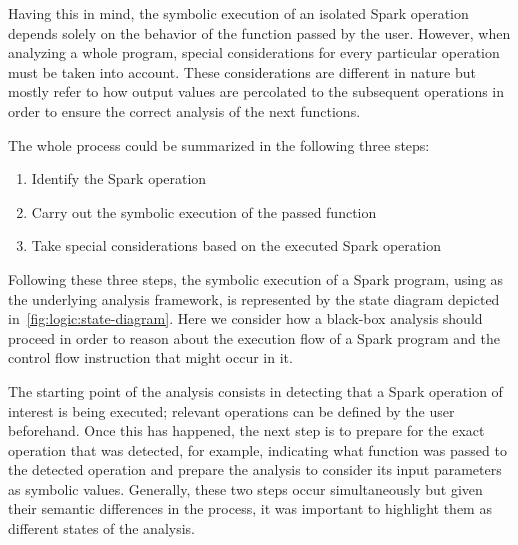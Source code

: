 %	
%	
%	
%	

Having this in mind, the symbolic execution of an isolated Spark operation depends solely on the behavior of the function passed by the user. However, when analyzing a whole program, special considerations for every particular operation must be taken into account. These considerations are different in nature but mostly refer to how output values are percolated to the subsequent operations in order to ensure the correct analysis of the next functions.

The whole process could be summarized in the following three steps:
\begin{enumerate}
	\item Identify the Spark operation
	\item Carry out the symbolic execution of the passed function
	\item Take special considerations based on the executed Spark operation
\end{enumerate}

Following these three steps, the symbolic execution of a Spark program, using \spf as the underlying analysis framework, is represented by the state diagram depicted in~\ref{fig:logic:state-diagram}. Here we consider how a black-box analysis should proceed in order to reason about the execution flow of a Spark program and the control flow instruction that might occur in it.

The starting point of the analysis consists in detecting that a Spark operation of interest is being executed; relevant operations can be defined by the user beforehand. Once this has happened, the next step is to prepare for the exact operation that was detected, for example, indicating what function was passed to the detected operation and prepare the \spf analysis to consider its input parameters as symbolic values. Generally, these two steps occur simultaneously but given their semantic differences in the process, it was important to highlight them as different states of the analysis.

